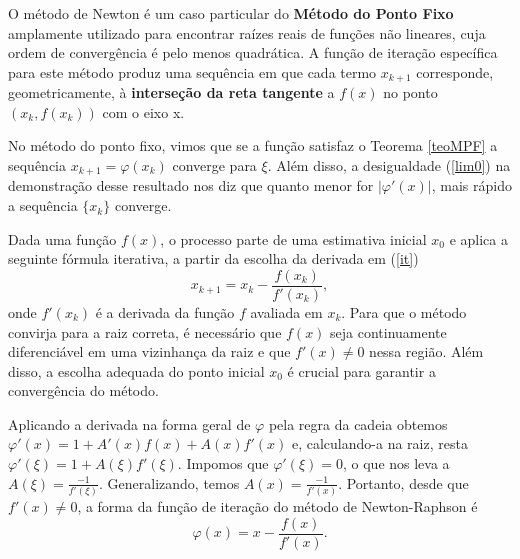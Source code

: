 

O método de Newton é um caso particular do \textbf{Método do Ponto Fixo} amplamente utilizado para encontrar raízes %
reais de funções não lineares, cuja ordem de convergência é pelo menos quadrática. A função de iteração específica para este método produz uma sequência em que cada termo $x_{k+1}$ corresponde, geometricamente, à \textbf{interseção da reta tangente} a $f(x)$ no ponto $(x_k, f(x_k))$ com o eixo x. 

No método do ponto fixo, vimos que se a função satisfaz o Teorema \ref{teoMPF} a sequência $x_{k+1} = \varphi(x_k)$ converge para $\xi$. Além disso, a desigualdade (\ref{lim0}) na demonstração desse resultado nos diz que quanto menor for $|\varphi'(x)|$, mais rápido a sequência $\{x_k\}$ converge.

Dada uma função \(f(x)\), o processo parte de uma estimativa inicial \(x_0\) e aplica a seguinte fórmula iterativa, a partir da escolha da derivada em (\ref{it})
\begin{equation} \label{nr}
    x_{k+1} = x_k - \frac{f(x_k)}{f'(x_k)},
\end{equation}
onde \(f'(x_k)\) é a derivada da função \(f\) avaliada em \(x_k\).
Para que o método convirja para a raiz correta, é necessário que \(f(x)\) seja continuamente diferenciável em uma vizinhança da raiz e que \(f'(x) \neq 0\) nessa região. Além disso, a escolha adequada do ponto inicial \(x_0\) é crucial para garantir a convergência do método.

Aplicando a derivada na forma geral de $\varphi$ pela regra da cadeia obtemos $\varphi'(x) = 1 + A'(x)f(x) + A(x)f'(x)$ e, calculando-a na raiz, resta $\varphi'(\xi) = 1 + A(\xi)f'(\xi)$. Impomos que $\varphi'(\xi) = 0$, o que nos leva a $A(\xi) = \frac{-1}{f'(\xi)}$. Generalizando, temos $A(x) = \frac{-1}{f'(x)}$. Portanto, desde que $f'(x) \neq 0$, a forma da função de iteração do método de Newton-Raphson é 
\begin{equation} \label{phiNR1d}
    \varphi(x) = x - \frac{f(x)}{f'(x)}.
\end{equation}

